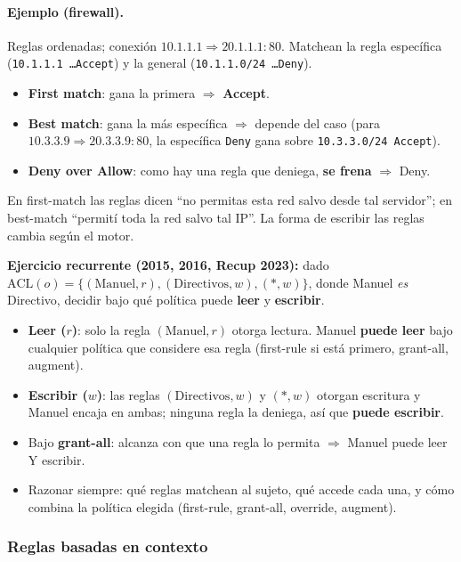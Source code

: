 \documentclass[../main.tex]{subfiles}
\begin{document}
\paragraph{Ejemplo (firewall).} Reglas ordenadas; conexión $10.1.1.1 \Rightarrow 20.1.1.1{:}80$. Matchean la regla específica (\texttt{10.1.1.1 \dots Accept}) y la general (\texttt{10.1.1.0/24 \dots Deny}).
\begin{itemize}[nosep]
  \item \textbf{First match}: gana la primera $\Rightarrow$ \textbf{Accept}.
  \item \textbf{Best match}: gana la más específica $\Rightarrow$ depende del caso (para $10.3.3.9 \Rightarrow 20.3.3.9{:}80$, la específica \texttt{Deny} gana sobre \texttt{10.3.3.0/24 Accept}).
  \item \textbf{Deny over Allow}: como hay una regla que deniega, \textbf{se frena} $\Rightarrow$ Deny.
\end{itemize}
En first-match las reglas dicen ``no permitas esta red salvo desde tal servidor''; en best-match ``permití toda la red salvo tal IP''. La forma de escribir las reglas cambia según el motor.

\begin{examen}
\textbf{Ejercicio recurrente (2015, 2016, Recup 2023):} dado $\mathrm{ACL}(o)=\{(\text{Manuel},r),(\text{Directivos},w),(*,w)\}$, donde Manuel \emph{es} Directivo, decidir bajo qué política puede \textbf{leer} y \textbf{escribir}.
\begin{itemize}[nosep]
  \item \textbf{Leer ($r$)}: solo la regla $(\text{Manuel},r)$ otorga lectura. Manuel \textbf{puede leer} bajo cualquier política que considere esa regla (first-rule si está primero, grant-all, augment).
  \item \textbf{Escribir ($w$)}: las reglas $(\text{Directivos},w)$ y $(*,w)$ otorgan escritura y Manuel encaja en ambas; ninguna regla la deniega, así que \textbf{puede escribir}.
  \item Bajo \textbf{grant-all}: alcanza con que una regla lo permita $\Rightarrow$ Manuel puede leer Y escribir.
  \item Razonar siempre: qué reglas matchean al sujeto, qué accede cada una, y cómo combina la política elegida (first-rule, grant-all, override, augment).
\end{itemize}
\end{examen}

\subsubsection{Reglas basadas en contexto}
\end{document}
